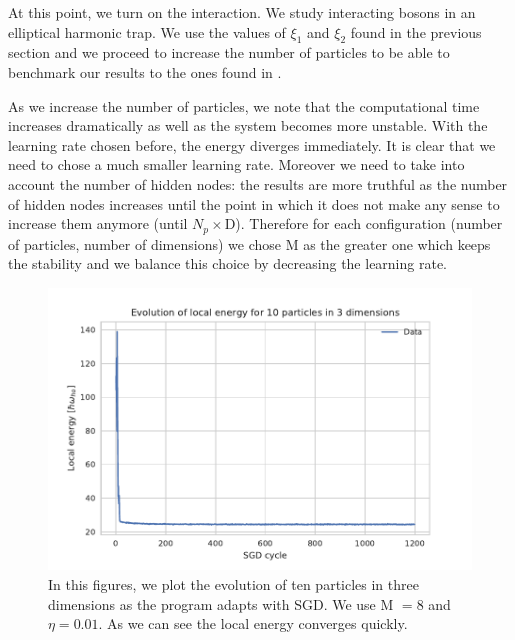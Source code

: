 At this point, we turn on the interaction. We study interacting bosons in an elliptical harmonic trap. We use the values of $\xi_1$ and $\xi_2$ found in the previous section and we proceed to increase the number of particles to be able to benchmark our results to the ones found in \cite{DalfString}.
 
As we increase the number of particles, we note that the computational time increases dramatically as well as the system becomes more unstable. With the learning rate chosen before, the energy diverges immediately. It is clear that we need to chose a much smaller learning rate. Moreover we need to take into account the number of hidden nodes: the results are more truthful as the number of hidden nodes increases until the point in which it does not make any sense to increase them anymore (until $N_p\times $D). Therefore for each configuration (number of particles, number of dimensions) we chose M as the greater one which keeps the stability and we balance this choice by decreasing the learning rate.

\begin{figure}[H]
		\centering
		\includegraphics[scale=1.0]{plot_final10.pdf}
	\caption{In this figures, we plot the evolution of ten particles in three dimensions as the program adapts with SGD. We use M $=8$ and $\eta=0.01$. As we can see the local energy converges quickly.}
	\label{Fig:7_8}
\end{figure}

